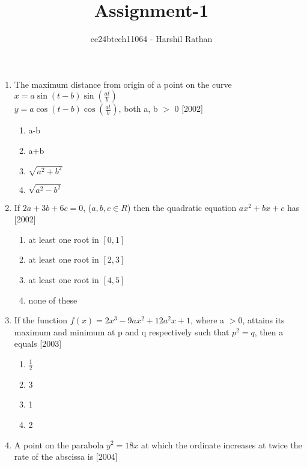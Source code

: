 \documentclass[journal,12pt,twocolumn]{IEEEtran}
\theoremstyle{remark}
\begin{document}

\vspace{3cm}

\title{Assignment-1}
\author{ee24btech11064 - Harshil Rathan}
\maketitle
\newpage
\bigskip

\renewcommand{\thefigure}{\theenumi}
\renewcommand{\thetable}{\theenumi}
\begin{enumerate}
\item The maximum distance from origin of a point on the curve\\ $x = a \sin(t-b) \sin(\frac{at}{b})$\\ $y = a \cos(t-b) \cos(\frac{at}{b})$, both a, b $>$ 0 \hfill{[2002]}
\begin{enumerate}
    \item a-b
        \item a+b
	    \item $\sqrt{a^2+b^2}$
	        \item $\sqrt{a^2-b^2}$  \\
		\end{enumerate}
		\item If $2a+3b+6c=0$, ($a,b,c \in R$) then the quadratic equation $ax^2+bx+c$ has \hfill{[2002]}
		\begin{enumerate}
		    \item at least one root in $[0,1]$
		        \item at  least one root in $[2,3]$
			    \item at least one root in $[4,5]$
			        \item none of these \\
				\end{enumerate}
				\item If the function $f(x)=2x^3-9ax^2+12a^2x+1$, where a $>$0, attains its maximum and minimum at p and q respectively such that $p
				    ^2=q$, then a equals  \hfill{[2003]}
				    \begin{enumerate}
				           \item $\frac{1}{2}$
					          \item 3
						         \item 1
							        \item 2
								\end{enumerate}
								\item A point on the parabola $y^2=18x$ at which the ordinate increases at twice the rate of the abscissa is \hfill{[2004]}

\end{enumerate}
\end{document}
